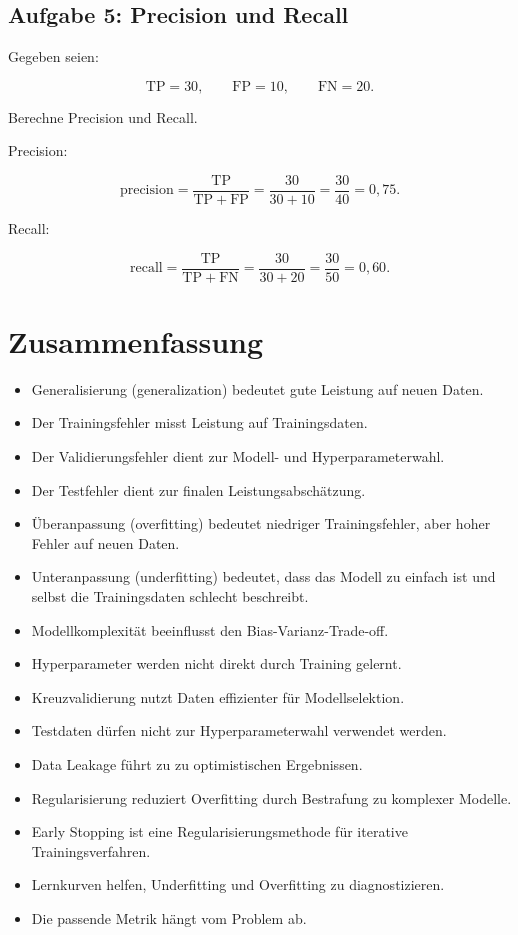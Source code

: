 \subsection{Aufgabe 5: Precision und Recall}

Gegeben seien:

\[
    \mathrm{TP}=30,
    \qquad
    \mathrm{FP}=10,
    \qquad
    \mathrm{FN}=20.
\]

Berechne Precision und Recall.

\begin{examplebox}
Precision:

\[
    \mathrm{precision}
    =
    \frac{\mathrm{TP}}{\mathrm{TP}+\mathrm{FP}}
    =
    \frac{30}{30+10}
    =
    \frac{30}{40}
    =
    0{,}75.
\]

Recall:

\[
    \mathrm{recall}
    =
    \frac{\mathrm{TP}}{\mathrm{TP}+\mathrm{FN}}
    =
    \frac{30}{30+20}
    =
    \frac{30}{50}
    =
    0{,}60.
\]
\end{examplebox}

\section{Zusammenfassung}

\begin{itemize}
    \item Generalisierung (generalization) bedeutet gute Leistung auf neuen Daten.
    \item Der Trainingsfehler misst Leistung auf Trainingsdaten.
    \item Der Validierungsfehler dient zur Modell- und Hyperparameterwahl.
    \item Der Testfehler dient zur finalen Leistungsabschätzung.
    \item Überanpassung (overfitting) bedeutet niedriger Trainingsfehler, aber hoher Fehler auf neuen Daten.
    \item Unteranpassung (underfitting) bedeutet, dass das Modell zu einfach ist und selbst die Trainingsdaten schlecht beschreibt.
    \item Modellkomplexität beeinflusst den Bias-Varianz-Trade-off.
    \item Hyperparameter werden nicht direkt durch Training gelernt.
    \item Kreuzvalidierung nutzt Daten effizienter für Modellselektion.
    \item Testdaten dürfen nicht zur Hyperparameterwahl verwendet werden.
    \item Data Leakage führt zu zu optimistischen Ergebnissen.
    \item Regularisierung reduziert Overfitting durch Bestrafung zu komplexer Modelle.
    \item Early Stopping ist eine Regularisierungsmethode für iterative Trainingsverfahren.
    \item Lernkurven helfen, Underfitting und Overfitting zu diagnostizieren.
    \item Die passende Metrik hängt vom Problem ab.
\end{itemize}

